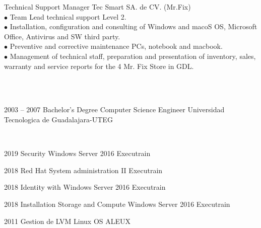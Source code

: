 \documentclass[9pt]{developercv} %
\begin{document}
\begin{entrylist}
		{Technical Support Manager}
	{Tec Smart SA. de CV. (Mr.Fix)}
	{{}\\$\bullet$ Team Lead technical support Level 2.
		\\$\bullet$ Installation, configuration and consulting of Windows and macoS OS, Microsoft Office, Antivirus and SW third party.
		\\$\bullet$ Preventive and corrective maintenance PCs, notebook and macbook.
		\\$\bullet$ Management of technical staff, preparation and presentation of inventory, sales, warranty and service reports for the 4 Mr. Fix Store in GDL. \\ \\}
\end{entrylist}


\\

\begin{entrylist}
	\entry
		{2003 -- 2007}
		{Bachelor's Degree}
		{Computer Science Engineer}
		{Universidad Tecnologica de Guadalajara-UTEG}
\end{entrylist}

\\

\begin{entrylist}
	\entry
		{2019}
		{Security Windows Server 2016}
		{Executrain}
		{}
\end{entrylist}

\begin{entrylist}
	\entry
	{2018}
	{Red Hat System administration II}
	{Executrain}
	{}
\end{entrylist}

\begin{entrylist}
	\entry
	{2018}
	{Identity with Windows Server 2016}
	{Executrain}
	{}
\end{entrylist}


\begin{entrylist}
	\entry
	{2018}
	{Installation Storage and Compute Windows Server 2016}
	{Executrain}
	{}
\end{entrylist}

\begin{entrylist}
	\entry
	{2011}
	{Gestion de LVM Linux OS}
	{ALEUX}
	{}
\end{entrylist}
\end{document}
